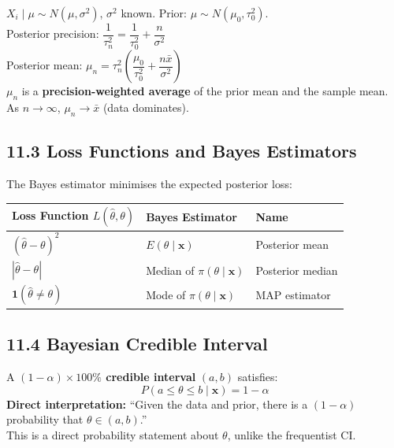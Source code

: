 \documentclass[12pt]{article}
\newcommand{\hcell}[1]{\textbf{\color{white}#1}}
\begin{document}
\begin{derivbox}
$X_i\mid\mu\sim N(\mu,\sigma^2)$, $\sigma^2$ known. Prior: $\mu\sim N(\mu_0,\tau_0^2)$.\\[4pt]
Posterior precision: $\dfrac{1}{\tau_n^2}=\dfrac{1}{\tau_0^2}+\dfrac{n}{\sigma^2}$\\[8pt]
Posterior mean: $\mu_n=\tau_n^2\!\left(\dfrac{\mu_0}{\tau_0^2}+\dfrac{n\bar x}{\sigma^2}\right)$\\[8pt]
$\mu_n$ is a \textbf{precision-weighted average} of the prior mean and the sample mean. As $n\to\infty$, $\mu_n\to\bar x$ (data dominates).
\end{derivbox}

\subsection{11.3 Loss Functions and Bayes Estimators}

\begin{defbox}
The Bayes estimator minimises the expected posterior loss:
\begin{center}{\small
\begin{tabular}{|l|C{4cm}|C{3.5cm}|}
\hline{}\hcell{Loss Function $L(\hat\theta,\theta)$}&\hcell{Bayes Estimator}&\hcell{Name}\\\hline
$(\hat\theta-\theta)^2$ & $E(\theta\mid\mathbf x)$ & Posterior mean\\\hline
$|\hat\theta-\theta|$ & Median of $\pi(\theta\mid\mathbf x)$ & Posterior median\\\hline
$\mathbf{1}(\hat\theta\neq\theta)$ & Mode of $\pi(\theta\mid\mathbf x)$ & MAP estimator\\\hline
\end{tabular}}
\end{center}
\end{defbox}

\subsection{11.4 Bayesian Credible Interval}

\begin{defbox}
A \textbf{$(1-\alpha)\times100\%$ credible interval} $(a,b)$ satisfies:
\[P(a\leq\theta\leq b\mid\mathbf x)=1-\alpha\]
\textbf{Direct interpretation:} ``Given the data and prior, there is a $(1-\alpha)$ probability that $\theta\in(a,b)$.''\\[4pt]
This is a direct probability statement about $\theta$, unlike the frequentist CI.
\end{defbox}
\end{document}
